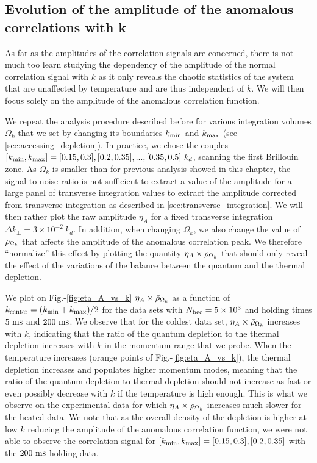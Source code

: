 \subsection{Evolution of the amplitude of the anomalous correlations with k}

As far as the amplitudes of the correlation signals are concerned, there is not much too learn studying the dependency of the amplitude of the normal correlation signal with $k$ as it only reveals the chaotic statistics of the system that are unaffected by temperature and are thus independent of $k$. We will then focus solely on the amplitude of the anomalous correlation function. 

We repeat the analysis procedure described before for various integration volumes $\Omega_k$ that we set by changing its boundaries $k_{\rm{min}}$ and $k_{\rm{max}}$ (see \ref{sec:accessing_depletion}). In practice, we chose the couples $[k_{\rm{min}},k_{\rm{max}}]=[0.15,0.3],[0.2,0.35],...,[0.35,0.5] \ k_d$, scanning the first Brillouin zone. As $\Omega_k$ is smaller than for previous analysis showed in this chapter, the signal to noise ratio is not sufficient to extract a value of the amplitude for a large panel of transverse integration values to extract the amplitude corrected from transverse integration as described in \ref{sec:transverse_integration}. We will then rather plot the raw amplitude $\eta_A$ for a fixed transverse integration $\Delta k_{\perp}=3 \times 10^{-2} \ k_d$. In addition, when changing $\Omega_k$, we also change the value of $\bar{\rho}_{\Omega_k}$ that affects the amplitude of the anomalous correlation peak. We therefore ``normalize'' this effect by plotting the quantity $\eta_A \times \bar{\rho}_{\Omega_k}$ that should only reveal the effect of the variations of the balance between the quantum and the thermal depletion.

We plot on Fig.-\ref{fig:eta_A_vs_k} $\eta_A \times \bar{\rho}_{\Omega_k}$ as a function of $k_{\rm{center}}=(k_{\rm{min}}+k_{\rm{max}})/2$ for the data sets with $N_{\rm{bec}}= 5 \times 10^3$ and holding times $5 \ \rm{ms}$ and $200 \ \rm{ms}$. We observe that for the coldest data set, $\eta_A \times \bar{\rho}_{\Omega_k}$ increases with $k$, indicating that the ratio of the quantum depletion to the thermal depletion increases with $k$ in the momentum range that we probe. When the temperature increases (orange points of Fig.-\ref{fig:eta_A_vs_k}), the thermal depletion increases and populates higher momentum modes, meaning that the ratio of the quantum depletion to thermal depletion should not increase as fast or even possibly decrease with $k$ if the temperature is high enough. This is what we observe on the experimental data for which $\eta_A \times \bar{\rho}_{\Omega_k}$ increases much slower for the heated data. We note that as the overall density of the depletion is higher at low $k$ reducing the amplitude of the anomalous correlation function, we were not able to observe the correlation signal for $[k_{\rm{min}},k_{\rm{max}}]=[0.15,0.3],[0.2,0.35]$ with the $200 \ \rm{ms}$ holding data.

